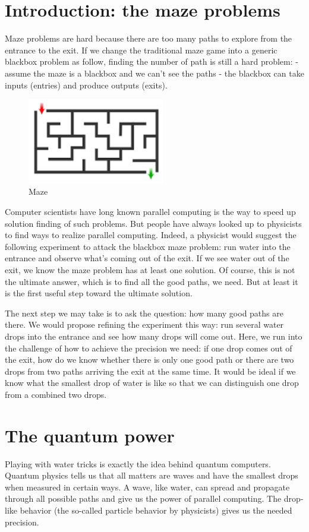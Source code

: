 \documentclass{book}
\begin{document}
\section{Introduction: the maze problems}
Maze problems are hard because there are too many paths to explore from the entrance to the exit. If we change the traditional maze game into a generic blackbox problem as follow, finding the number of path is still a hard problem:
- assume the maze is a blackbox and we can't see the paths
- the blackbox can take inputs (entries) and produce outputs (exits).

\begin{figure}[ht]
\includegraphics[width=6cm]{pic/maze.png}
\caption{Maze}
\label{Maze}
\end{figure}

Computer scientists have long known parallel computing is the way to speed up solution finding of such problems. But people have always looked up to physicists to find ways to realize parallel computing. Indeed, a physicist would suggest the following experiment to attack the blackbox maze problem: run water into the entrance and observe what's coming out of the exit. If we see water out of the exit, we know the maze problem has at least one solution. Of course, this is not the ultimate answer, which is to find all the good paths, we need. But at least it is the first useful step toward the ultimate solution.

The next step we may take is to ask the question: how many good paths are there. We would propose refining the experiment this way: run several water drops into the entrance and see how many drops will come out. Here, we run into the challenge of how to achieve the precision we need: if one drop comes out of the exit, how do we know whether there is only one good path or there are two drops from two paths arriving the exit at the same time. It would be ideal if we know what the smallest drop of water is like so that we can distinguish one drop from a combined two drops.

\section{The quantum power}
Playing with water tricks is exactly the idea behind quantum computers. Quantum physics tells us that all matters are waves and have the smallest drops when measured in certain ways. A wave, like water, can spread and propagate through all possible paths and give us the power of parallel computing. The drop-like behavior (the so-called particle behavior by physicists) gives us the needed precision.
\end{document}
